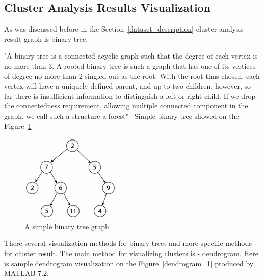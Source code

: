 \documentclass[a4paper,oneside]{article}
\begin{document}
\subsection{Cluster Analysis Results Visualization}

As was discussed before in the Section~\ref{dataset_description} cluster analysis result graph is binary tree.

"A binary tree is a connected acyclic graph such that the degree of each vertex is no more than 3. A rooted binary tree is such a graph that has one of its vertices of degree no more than 2 singled out as the root. With the root thus chosen, each vertex will have a uniquely defined parent, and up to two children; however, so far there is insufficient information to distinguish a left or right child. If we drop the connectedness requirement, allowing multiple connected component in the graph, we call such a structure a forest"~\cite{BINARY_TREE} Simple binary tree showed on the Figure~\ref{simple_binary_tree}

\begin{figure}
\begin{center}
	\includegraphics[scale=1.0]{simple_binary_tree.png}
	\caption{A simple binary tree graph}
	\label{simple_binary_tree}
\end{center}
\end{figure}


There several visualization methods for binary trees and more specific methods for cluster result. The main method for visualizing clusters is - dendrogram. Here is sample dendrogram visualization on the Figure~\ref{dendrogram_1} produced by MATLAB 7.2.
\end{document}
